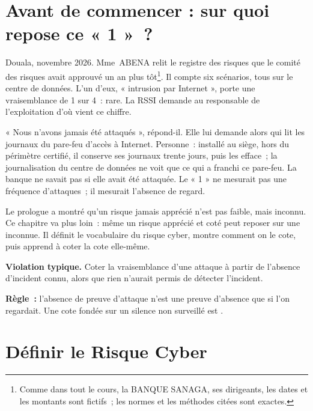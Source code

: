 \bigskip

\section*{Avant de commencer : sur quoi repose ce « 1 »~?}

Douala, novembre 2026. Mme~ABENA relit le registre des risques que le
comité des risques avait approuvé un an plus tôt\footnote{Comme dans tout
le cours, la BANQUE SANAGA, ses dirigeants, les dates et les montants sont
fictifs~; les normes et les méthodes citées sont exactes.}. Il compte six
scénarios, tous sur le centre de données. L'un d'eux, « intrusion par
Internet », porte une vraisemblance de 1 sur 4~: rare. La RSSI demande au
responsable de l'exploitation d'où vient ce chiffre.

« Nous n'avons jamais été attaqués », répond-il. Elle lui demande alors qui
lit les journaux du pare-feu d'accès à Internet. Personne~: installé au
siège, hors du périmètre certifié, il conserve ses journaux trente jours,
puis les efface~; la journalisation du centre de données ne voit que ce
qui a franchi ce pare-feu. La banque ne savait pas si elle avait été
attaquée. Le « 1 » ne mesurait pas une fréquence d'attaques~; il mesurait
l'absence de regard.

\medskip

Le prologue a montré qu'un risque jamais apprécié n'est pas faible, mais
inconnu. Ce chapitre va plus loin~: même un risque apprécié et coté peut
reposer sur une inconnue. Il définit le vocabulaire du risque cyber, montre
comment on le cote, puis apprend à coter la cote elle-même.

\begin{boxalert}
\textbf{Violation typique.} Coter la vraisemblance d'une attaque à partir
de l'absence d'incident connu, alors que rien n'aurait permis de détecter
l'incident.

\smallskip
\textbf{Règle~:} l'absence de preuve d'attaque n'est une preuve d'absence
que si l'on regardait. Une cote fondée sur un silence non surveillé est
\NEK{}.
\end{boxalert}

\separateur

\section{Définir le Risque Cyber}
\label{sec:c02-definir}

